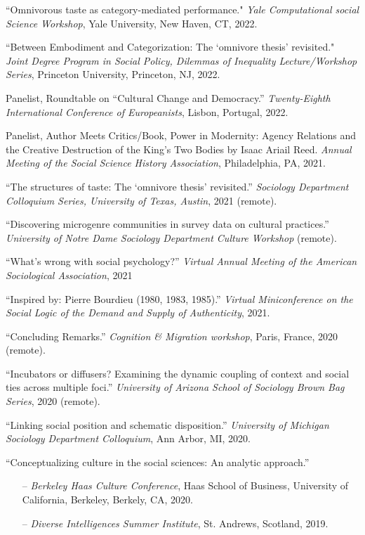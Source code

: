 \ind ``Omnivorous taste as category-mediated performance." {\em Yale Computational social Science Workshop}, Yale University, New Haven, CT, 2022. 

\ind ``Between Embodiment and Categorization: The `omnivore thesis' revisited." {\em Joint Degree Program in Social Policy, Dilemmas of Inequality Lecture/Workshop Series}, Princeton University, Princeton, NJ, 2022. 

\ind Panelist, Roundtable on ``Cultural Change and Democracy.'' {\em Twenty-Eighth International Conference of Europeanists}, Lisbon, Portugal, 2022. 

\ind Panelist, Author Meets Critics/Book, Power in Modernity: Agency Relations and the Creative Destruction of the King's Two Bodies by Isaac Ariail Reed. {\em Annual Meeting of the Social Science History Association}, Philadelphia, PA, 2021.

\ind ``The structures of taste: The `omnivore thesis' revisited.'' {\em Sociology Department Colloquium Series, University of Texas, Austin}, 2021 (remote). 

\ind ``Discovering microgenre communities in survey data on cultural practices.'' {\em University of Notre Dame Sociology Department Culture Workshop} (remote).

\ind ``What's wrong with social psychology?'' {\em Virtual Annual Meeting of the American Sociological Association}, 2021

\ind ``Inspired by: Pierre Bourdieu (1980, 1983, 1985).'' {\em Virtual Miniconference on the Social Logic of the Demand and Supply of Authenticity}, 2021.

\ind ``Concluding Remarks.'' {\em Cognition \& Migration workshop}, Paris, France, 2020 (remote).

\ind ``Incubators or diffusers? Examining the dynamic coupling of context and social ties across multiple foci.'' {\em University of Arizona School of Sociology Brown Bag Series},  2020 (remote).

\ind ``Linking social position and schematic disposition.'' {\em University of Michigan Sociology Department Colloquium}, Ann Arbor, MI, 2020.

\ind ``Conceptualizing culture in the social sciences: An analytic approach.''
\begin{itemize}[leftmargin=0.8in, topsep = 0pt]
	\setlength\itemsep{-0.55em}
	\item[--] {\em Berkeley Haas Culture Conference}, Haas School of Business, University of California, Berkeley, Berkely, CA, 2020.
	\item[--] {\em Diverse Intelligences Summer Institute}, St. Andrews, Scotland, 2019.
\end{itemize}

